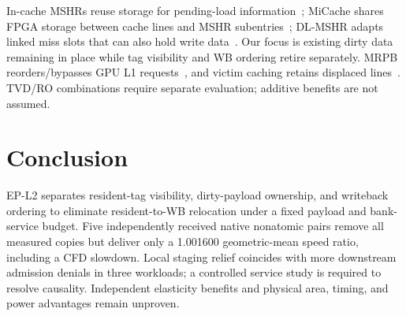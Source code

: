 \documentclass[conference,letterpaper]{IEEEtran}
\newcommand{\epl}{EP-L2}
\begin{document}
In-cache MSHRs reuse storage for pending-load information~\cite{farkas}; MiCache shares FPGA storage between cache lines and MSHR subentries~\cite{micache}; DL-MSHR adapts linked miss slots that can also hold write data~\cite{dlmshr}. Our focus is existing dirty data remaining in place while tag visibility and WB ordering retire separately. MRPB reorders/bypasses GPU L1 requests~\cite{mrpb}, and victim caching retains displaced lines~\cite{victim}. TVD/RO combinations require separate evaluation; additive benefits are not assumed.

\section{Conclusion}
\epl{} separates resident-tag visibility, dirty-payload ownership, and writeback ordering to eliminate resident-to-WB relocation under a fixed payload and bank-service budget. Five independently received native nonatomic pairs remove all measured copies but deliver only a 1.001600 geometric-mean speed ratio, including a CFD slowdown. Local staging relief coincides with more downstream admission denials in three workloads; a controlled service study is required to resolve causality. Independent elasticity benefits and physical area, timing, and power advantages remain unproven.
\end{document}
